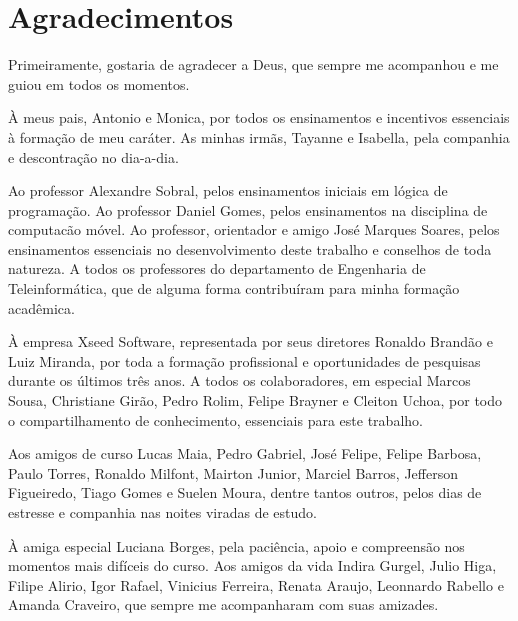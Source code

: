 \chapter*{Agradecimentos}
\label{chp:agrad}%
\thispagestyle{empty}

Primeiramente, gostaria de agradecer a Deus, que sempre me acompanhou e me guiou em todos os momentos.

À meus pais, Antonio e Monica, por todos os ensinamentos e incentivos essenciais à formação de meu caráter. As minhas irmãs, Tayanne e Isabella, pela companhia e descontração no dia-a-dia.

Ao professor Alexandre Sobral, pelos ensinamentos iniciais em lógica de programação. Ao professor Daniel Gomes, pelos ensinamentos na disciplina de computacão móvel. Ao professor, orientador e amigo José Marques Soares, pelos ensinamentos essenciais no desenvolvimento deste trabalho e conselhos de toda natureza. A todos os professores do departamento de Engenharia de Teleinformática, que de alguma forma contribuíram para minha formação acadêmica.

À empresa Xseed Software, representada por seus diretores Ronaldo Brandão e Luiz Miranda, por toda a formação profissional e oportunidades de pesquisas durante os últimos três anos. A todos os colaboradores, em especial Marcos Sousa, Christiane Girão, Pedro Rolim, Felipe Brayner e Cleiton Uchoa, por todo o compartilhamento de conhecimento, essenciais para este trabalho.

Aos amigos de curso Lucas Maia, Pedro Gabriel, José Felipe, Felipe Barbosa, Paulo Torres, Ronaldo Milfont, Mairton Junior, Marciel Barros, Jefferson Figueiredo, Tiago Gomes e Suelen Moura, dentre tantos outros,  pelos dias de estresse e companhia nas noites viradas de estudo.

À amiga especial Luciana Borges, pela paciência, apoio e compreensão nos momentos mais difíceis do curso. Aos amigos da vida Indira Gurgel, Julio Higa, Filipe Alirio, Igor Rafael, Vinicius Ferreira, Renata Araujo, Leonnardo Rabello e Amanda Craveiro, que sempre me acompanharam com suas amizades.